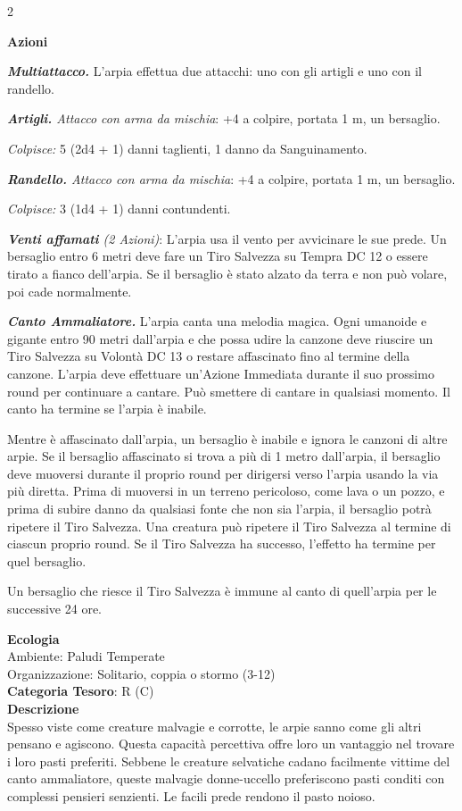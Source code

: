 \begin{multicols}{2}
{\textbf{Azioni}

\emph{\textbf{Multiattacco.}} L'arpia effettua due attacchi: uno con gli artigli e uno con il randello.

\emph{\textbf{Artigli.} Attacco con arma da mischia}: +4 a colpire, portata 1 m, un bersaglio.

\emph{Colpisce:} 5 (2d4 + 1) danni taglienti, 1 danno da Sanguinamento.

\emph{\textbf{Randello.} Attacco con arma da mischia}: +4 a colpire, portata 1 m, un bersaglio.

\emph{Colpisce:} 3 (1d4 + 1) danni contundenti.

\emph{\textbf{Venti affamati} (2 Azioni)}: L'arpia usa il vento per avvicinare le sue prede. Un bersaglio entro 6 metri deve fare un Tiro Salvezza su Tempra DC 12 o essere tirato a fianco dell'arpia. Se il bersaglio è stato alzato da terra e non può volare, poi cade normalmente.

\emph{\textbf{Canto Ammaliatore.}} L'arpia canta una melodia magica. Ogni umanoide e gigante entro 90 metri dall'arpia e che possa udire la canzone deve riuscire un Tiro Salvezza su Volontà DC 13 o restare affascinato fino al termine della canzone. L'arpia deve effettuare un'Azione Immediata durante il suo prossimo round per continuare a cantare. Può smettere di cantare in qualsiasi momento. Il canto ha termine se l'arpia è inabile.

Mentre è affascinato dall'arpia, un bersaglio è inabile e ignora le canzoni di altre arpie. Se il bersaglio affascinato si trova a più di 1 metro dall'arpia, il bersaglio deve muoversi durante il proprio round per dirigersi verso l'arpia usando la via più diretta. Prima di muoversi in un terreno pericoloso, come lava o un pozzo, e prima di subire danno da qualsiasi fonte che non sia l'arpia, il bersaglio potrà ripetere il Tiro Salvezza. Una creatura può ripetere il Tiro Salvezza al termine di ciascun proprio round. Se il Tiro Salvezza ha successo, l'effetto ha termine per quel bersaglio.

Un bersaglio che riesce il Tiro Salvezza è immune al canto di quell'arpia per le successive 24 ore.

\textbf{Ecologia}\\
Ambiente: Paludi Temperate\\
Organizzazione: Solitario, coppia o stormo (3-12)\\
\textbf{Categoria Tesoro}: R (C)\\
\textbf{Descrizione}\\
Spesso viste come creature malvagie e corrotte, le arpie sanno come gli altri pensano e agiscono. Questa capacità percettiva offre loro un vantaggio nel trovare i loro pasti preferiti. Sebbene le creature selvatiche cadano facilmente vittime del canto ammaliatore, queste malvagie donne-uccello preferiscono pasti conditi con complessi pensieri senzienti. Le facili prede rendono il pasto noioso.

}
\end{multicols}
